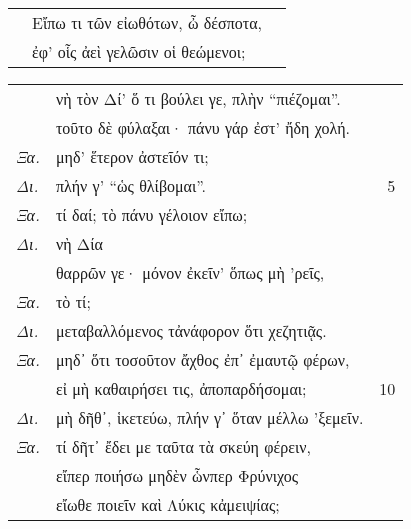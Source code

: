 \documentclass[13pt]{article}
\date{}
\begin{document}
\Large
\begin{greek}
\begin{spacing}{1.5}

\noindent\textit{\MakeUppercase{}}

\begin{tabularx}{\textwidth}{@{}lXr@{}}
  \phantom{Ξα.} & Εἴπω τι τῶν εἰωθότων, ὦ δέσποτα, & \\
  \phantom{Ξα.} & ἐφ’ οἷς ἀεὶ γελῶσιν οἱ θεώμενοι; & \\
\end{tabularx}

\vspace{1em}

\noindent\textit{\MakeUppercase{}}

\begin{tabularx}{\textwidth}{@{}lXr@{}}
  & νὴ τὸν Δί’ ὅ τι βούλει γε, πλὴν “πιέζομαι”. & \\
  & τοῦτο δὲ φύλαξαι· πάνυ γάρ ἐστ’ ἤδη χολή. & \\
  \textit{Ξα.} & μηδ’ ἕτερον ἀστεῖόν τι; & \\
  \textit{Δι.} & \hspace*{10em}πλήν γ’ “ὡς θλίβομαι”. & 5 \\
  \textit{Ξα.} & τί δαί; τὸ πάνυ γέλοιον εἴπω; & \\
  \textit{Δι.} & \hspace*{12.5em}νὴ Δία & \\
  & θαρρῶν γε· μόνον ἐκεῖν’ ὅπως μὴ ’ρεῖς, & \\
  \textit{Ξα.} & \hspace*{16em}τὸ τί; & \\
  \textit{Δι.} & μεταβαλλόμενος τἀνάφορον ὅτι χεζητιᾷς. & \\
  \textit{Ξα.} & μηδ᾽ ὅτι τοσοῦτον ἄχθος ἐπ᾽ ἐμαυτῷ φέρων, & \\
  & εἰ μὴ καθαιρήσει τις, ἀποπαρδήσομαι; & 10 \\
  \textit{Δι.} & μὴ δῆθ᾽, ἱκετεύω, πλήν γ᾽ ὅταν μέλλω 'ξεμεῖν. & \\
  \textit{Ξα.} & τί δῆτ᾽ ἔδει με ταῦτα τὰ σκεύη φέρειν, & \\
  & εἴπερ ποιήσω μηδὲν ὧνπερ Φρύνιχος & \\
  & εἴωθε ποιεῖν καὶ Λύκις κἀμειψίας; & \\
  
\end{tabularx}

\end{spacing}


\end{greek}
\end{document}
